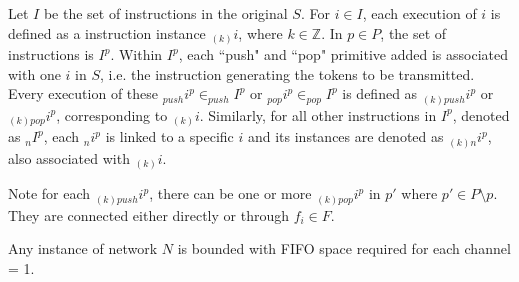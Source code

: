 \begin{definition}
Let $I$ be the set of instructions in the original $S$. For $i \in I$, each
execution of $i$ is defined as a instruction instance $_{(k)}i$, where $k \in \mathbb{Z}$.
 In $p \in P$, the set of instructions is $I^p$. Within $I^p$, each ``push" and ``pop" primitive added is associated with
 one $i$ in $S$, i.e. the instruction generating the tokens to be transmitted. Every execution of these $_{push}{i^p} \in _{push}{I^p}$ or $_{pop}{i^p} \in _{pop}{I^p} $ is defined
 as $_{(k)push}{i^p}$ or $_{(k)pop}{i^p}$, corresponding to $_{(k)}i$. Similarly,
 for all other instructions in $I^p$, denoted as $_nI^p$, each $_ni^p$ is linked to a specific $i$ and its instances are denoted as $_{(k)n}i^p$, also associated with $_{(k)}i$. 
\end{definition}

Note for each  $_{(k)push}{i^p}$, there can be one or more  $_{(k)pop}{i^p}$
in $p'$ where $p' \in P\setminus p$. They are connected either directly or  
through $f_i \in F$.

\begin{lemma}
\label{bounded}
Any instance of network $N$ is bounded with FIFO space required for each channel = 1.
\end{lemma}




